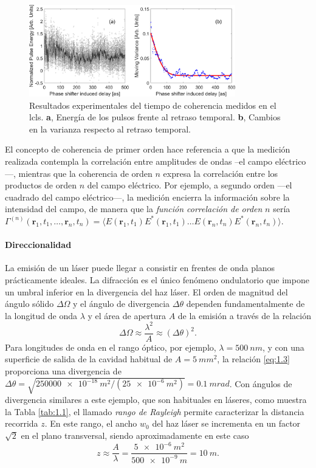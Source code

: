 \begin{figure}[htpb]
  \centering
  \includegraphics[width=0.8\textwidth]{Figuras/ch1_coher.png}
  \caption{Resultados experimentales del tiempo de coherencia medidos en el \acrshort{lcls}\autocite{Zhou2020}. \textbf{a}, Energía de los pulsos frente al retraso temporal. \textbf{b}, Cambios en la varianza respecto al retraso temporal.}
  \label{fig:1.8}
\end{figure}

El concepto de coherencia de primer orden hace referencia a que la medición realizada contempla la correlación entre amplitudes de ondas --el campo eléctrico---, mientras que la coherencia de orden $n$ expresa la correlación entre los productos de orden $n$ del campo eléctrico. Por ejemplo, a segundo orden ---el cuadrado del campo eléctrico---, la medición encierra la información sobre la intensidad del campo, de manera que la \emph{función correlación de orden} $n$ sería $\Gamma^{(n)}(\symbf{r}_1,t_1,\ldots,\symbf{r}_n,t_n) = \langle E(\symbf{r}_1,t_1)E^{*}(\symbf{r}_1,t_1)\ldots E(\symbf{r}_n,t_n)E^{*}(\symbf{r}_n,t_n)\rangle$.

\paragraph{Direccionalidad}
La emisión de un láser puede llegar a consistir en frentes de onda planos prácticamente ideales. La difracción es el único fenómeno ondulatorio que impone un umbral inferior en la divergencia del haz láser. El orden de magnitud del ángulo sólido $\Delta\Omega$ y el ángulo de divergencia $\Delta\theta$ dependen fundamentalmente de la longitud de onda $\lambda$ y el área de apertura $A$ de la emisión\autocite{Milonni1988} a través de la relación
\begin{equation}\label{eq:1.25}
    \Delta\Omega \approx \frac{\lambda^{2}}{A} \approx (\Delta\theta)^{2}.
\end{equation}
Para longitudes de onda en el rango óptico, por ejemplo, $\lambda = \qty{500}{nm}$, y con una superficie de salida de la cavidad habitual de $A = \qty{5}{mm^2}$, la relación \eqref{eq:1.3} proporciona una divergencia de $\Delta\theta = \sqrt{\qty{250000e-18}{m^2}/(\qty{25e-6}{m^2})} = \qty{0,1}{mrad}$. Con ángulos de divergencia similares a este ejemplo, que son habituales en láseres, como muestra la Tabla \ref{tab:1.1}, el llamado \emph{rango de Rayleigh} permite caracterizar la distancia recorrida $z$. En este rango, el ancho $w_0$ del haz láser se incrementa en un factor $\sqrt{2}$ en el plano transversal, siendo aproximadamente en este caso
\begin{equation}\label{eq:1.26}
    z\approx\frac{A}{\lambda} = \frac{\qty{5e-6}{m^2}}{\qty{500e-9}{m}} = \qty{10}{m}.
\end{equation}

